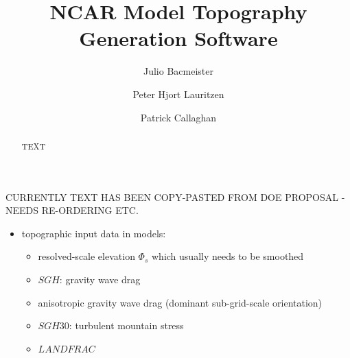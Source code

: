 \documentclass[gmd]{copernicus}
\begin{document}
\linenumbers

\title{NCAR Model Topography Generation Software}


\author[1]{Julio Bacmeister}
\author[1]{Peter Hjort Lauritzen}
\author[1]{Patrick Callaghan}













\maketitle  %



\begin{abstract}
TEXT
\end{abstract}



\introduction  %
CURRENTLY TEXT HAS BEEN COPY-PASTED FROM DOE PROPOSAL - NEEDS RE-ORDERING ETC.
\begin{itemize}
\item topographic input data in models:
\begin{itemize}
\item resolved-scale elevation $\Phi_s$ which usually needs to be smoothed
\item $SGH$: gravity wave drag
\item anisotropic gravity wave drag (dominant sub-grid-scale orientation)
\item $SGH30$: turbulent mountain stress
\item $LANDFRAC$
\end{itemize}
\end{itemize}
\end{document}
